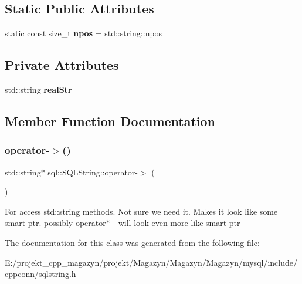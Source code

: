 \subsection*{Static Public Attributes}
\begin{DoxyCompactItemize}
\item 
\hypertarget{classsql_1_1_s_q_l_string_ab877913be4071b769350929953825c35}{}\label{classsql_1_1_s_q_l_string_ab877913be4071b769350929953825c35} 
static const size\+\_\+t {\bfseries npos} = std\+::string\+::npos
\end{DoxyCompactItemize}
\subsection*{Private Attributes}
\begin{DoxyCompactItemize}
\item 
\hypertarget{classsql_1_1_s_q_l_string_a8210f5235dd913e114d877c0a1ce30aa}{}\label{classsql_1_1_s_q_l_string_a8210f5235dd913e114d877c0a1ce30aa} 
std\+::string {\bfseries real\+Str}
\end{DoxyCompactItemize}


\subsection{Member Function Documentation}
\hypertarget{classsql_1_1_s_q_l_string_a9a73b4b85edeea38025068914fc7c392}{}\label{classsql_1_1_s_q_l_string_a9a73b4b85edeea38025068914fc7c392} 
\subsubsection{\texorpdfstring{operator-\/$>$()}{operator->()}}
{\footnotesize\ttfamily std\+::string$\ast$ sql\+::\+S\+Q\+L\+String\+::operator-\/$>$ (\begin{DoxyParamCaption}{ }\end{DoxyParamCaption})\hspace{0.3cm}{\ttfamily [inline]}}

For access std\+::string methods. Not sure we need it. Makes it look like some smart ptr. possibly operator$\ast$ -\/ will look even more like smart ptr 

The documentation for this class was generated from the following file\+:\begin{DoxyCompactItemize}
\item 
E\+:/projekt\+\_\+cpp\+\_\+magazyn/projekt/\+Magazyn/\+Magazyn/\+Magazyn/mysql/include/cppconn/sqlstring.\+h\end{DoxyCompactItemize}
